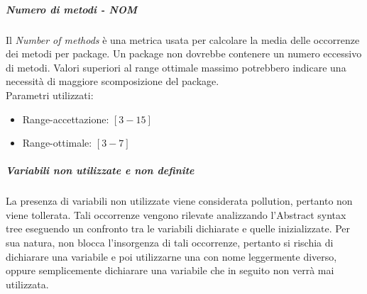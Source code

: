 \subparagraph{Numero di metodi - NOM}
Il \emph{Number of methods} è una metrica usata per calcolare la media
delle occorrenze dei metodi per package. Un package non dovrebbe
contenere un numero eccessivo di metodi. Valori superiori al range
ottimale massimo potrebbero indicare una necessità di maggiore
scomposizione del package. \\

Parametri utilizzati:
\begin{itemize}
\item Range-accettazione: $[3 - 15]$
\item Range-ottimale: $[3 - 7]$
\end{itemize}

\subparagraph{Variabili non utilizzate e non definite}
La presenza di variabili non utilizzate viene considerata pollution, pertanto non viene tollerata.
Tali occorrenze vengono rilevate analizzando l’Abstract syntax tree
eseguendo un confronto tra le variabili  dichiarate e quelle
inizializzate. Per sua natura,  non blocca
l'insorgenza di tali occorrenze, pertanto si rischia di dichiarare una
variabile  e poi utilizzarne una
con nome leggermente diverso, oppure semplicemente dichiarare una variabile che in seguito non
verrà mai utilizzata.\\

